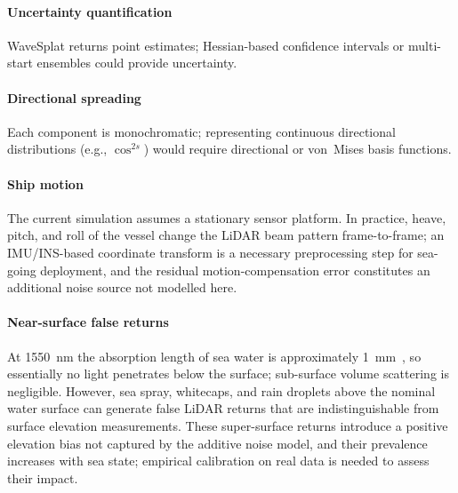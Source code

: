 \documentclass[review]{elsarticle}
\begin{document}
\paragraph{Uncertainty quantification}
WaveSplat returns point estimates;
Hessian-based confidence intervals or multi-start ensembles could
provide uncertainty.

\paragraph{Directional spreading}
Each component is monochromatic;
representing continuous directional distributions (e.g., $\cos^{2s}$)
would require directional or von~Mises basis functions.

\paragraph{Ship motion}
The current simulation assumes a stationary
sensor platform.  In practice, heave, pitch, and roll of the vessel
change the LiDAR beam pattern frame-to-frame; an IMU/INS-based
coordinate transform is a necessary preprocessing step for
sea-going deployment, and the residual motion-compensation error
constitutes an additional noise source not modelled here.

\paragraph{Near-surface false returns}
At 1550~nm the absorption length
of sea water is approximately 1~mm~\citep{hale1973}, so essentially
no light penetrates below the surface; sub-surface volume scattering
is negligible.  However, sea spray, whitecaps, and rain droplets
above the nominal water surface can generate false LiDAR returns
that are indistinguishable from surface elevation measurements.
These super-surface returns introduce a positive elevation bias
not captured by the additive noise model, and their prevalence
increases with sea state; empirical calibration on real data is
needed to assess their impact.
\end{document}
